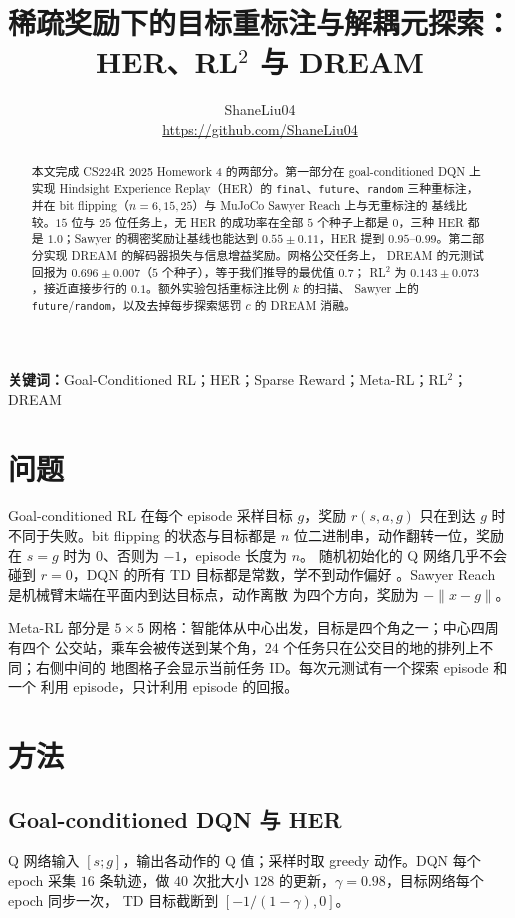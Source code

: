 \documentclass[10pt,twocolumn,a4paper]{ctexart}
\title{\vspace{-1.2em}\textbf{稀疏奖励下的目标重标注与解耦元探索：\\
HER、RL$^2$ 与 DREAM}}
\author{ShaneLiu04\\
\small\url{https://github.com/ShaneLiu04}}
\date{}
\begin{document}
\maketitle
\thispagestyle{fancy}

\begin{abstract}
本文完成 CS224R 2025 Homework 4 的两部分。第一部分在 goal-conditioned DQN 上实现
Hindsight Experience Replay（HER）的 \texttt{final}、\texttt{future}、\texttt{random}
三种重标注，并在 bit flipping（$n=6,15,25$）与 MuJoCo Sawyer Reach 上与无重标注的
基线比较。$15$ 位与 $25$ 位任务上，无 HER 的成功率在全部 $5$ 个种子上都是 $0$，三种
HER 都是 $1.0$；Sawyer 的稠密奖励让基线也能达到 $0.55\pm0.11$，HER 提到
$0.95$--$0.99$。第二部分实现 DREAM 的解码器损失与信息增益奖励。网格公交任务上，
DREAM 的元测试回报为 $0.696\pm0.007$（$5$ 个种子），等于我们推导的最优值 $0.7$；
RL$^2$ 为 $0.143\pm0.073$，接近直接步行的 $0.1$。额外实验包括重标注比例 $k$ 的扫描、
Sawyer 上的 \texttt{future}/\texttt{random}，以及去掉每步探索惩罚 $c$ 的 DREAM 消融。
\end{abstract}

\textbf{关键词：}Goal-Conditioned RL；HER；Sparse Reward；Meta-RL；RL$^2$；DREAM

\section{问题}
Goal-conditioned RL 在每个 episode 采样目标 $g$，奖励 $r(s,a,g)$ 只在到达 $g$ 时
不同于失败\citep{kaelbling1993goals,schaul2015uvfa}。bit flipping 的状态与目标都是
$n$ 位二进制串，动作翻转一位，奖励在 $s=g$ 时为 $0$、否则为 $-1$，episode 长度为 $n$。
随机初始化的 Q 网络几乎不会碰到 $r=0$，DQN 的所有 TD 目标都是常数，学不到动作偏好
\citep{andrychowicz2017her}。Sawyer Reach 是机械臂末端在平面内到达目标点，动作离散
为四个方向，奖励为 $-\lVert x-g\rVert$\citep{nair2018rig,todorov2012mujoco}。

Meta-RL 部分是 $5\times5$ 网格：智能体从中心出发，目标是四个角之一；中心四周有四个
公交站，乘车会被传送到某个角，$24$ 个任务只在公交目的地的排列上不同；右侧中间的
地图格子会显示当前任务 ID\citep{liu2021dream}。每次元测试有一个探索 episode 和一个
利用 episode，只计利用 episode 的回报。

\section{方法}
\subsection{Goal-conditioned DQN 与 HER}
Q 网络输入 $[s;g]$，输出各动作的 Q 值；采样时取 greedy 动作。DQN 每个 epoch 采集
$16$ 条轨迹，做 $40$ 次批大小 $128$ 的更新，$\gamma=0.98$，目标网络每个 epoch 同步一次，
TD 目标截断到 $[-1/(1-\gamma),0]$\citep{mnih2015dqn}。
\end{document}
